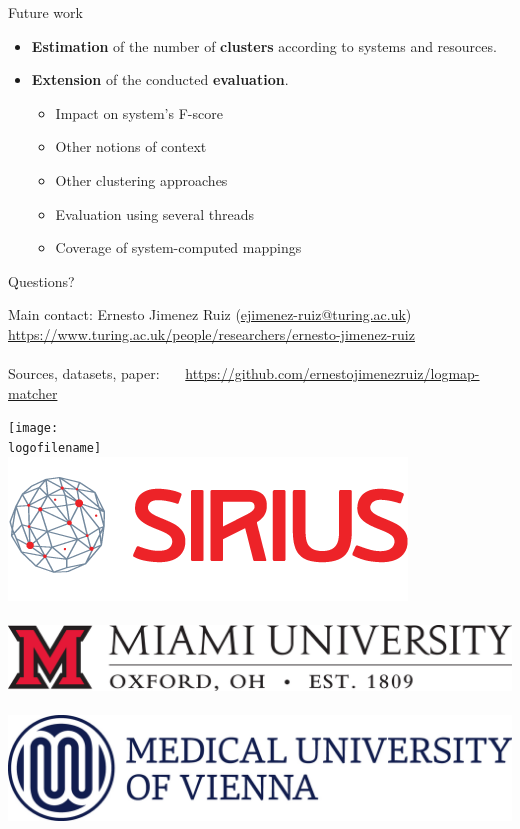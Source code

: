 \documentclass[t]{beamer}
\begin{document}
\begin{frame}{Future work}
  	
  	  \begin{itemize}    
  			\item \textbf{Estimation} of the number of \textbf{clusters} according to
  			systems and resources.
  			\item \textbf{Extension} of the conducted \textbf{evaluation}.
			\begin{itemize}
			  \item Impact on system's F-score
			  \item Other notions of context 
			  \item Other clustering approaches 
			  \item Evaluation using several threads
			  \item Coverage of system-computed mappings
  			\end{itemize} 
		\end{itemize}
  	
\end{frame}








\begin{frame}{Questions?}
	
	
	Main contact:
	Ernesto Jimenez Ruiz (\url{ejimenez-ruiz@turing.ac.uk})
	\url{https://www.turing.ac.uk/people/researchers/ernesto-jimenez-ruiz}
	\\~\\
	Sources, datasets, paper: 
	~~~\url{https://github.com/ernestojimenezruiz/logmap-matcher}
	
	\vspace{1.1cm}
	
	\texttt{[image: \\logofilename]}~~
	\includegraphics[height=1.4\gridblock]{images/sirius-logo.png}
	\\~~\\
	\includegraphics[height=1.0\gridblock]{images/muo.jpg}~~
	\includegraphics[height=1.2\gridblock]{images/muv.jpg}
		    
	\finalpage 
\end{frame}
\end{document}
